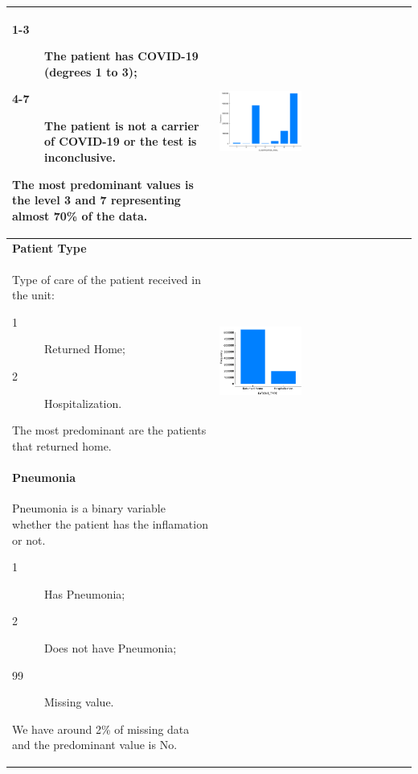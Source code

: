 \begin{longtable}{P{0.45\textwidth}P{0.45\textwidth}}
\begin{description}
    \item[1-3] The patient has COVID-19 (degrees 1 to 3);
    \item[4-7] The patient is not a carrier of COVID-19 or the test is inconclusive.
\end{description}
The most predominant values is the level 3 and 7 representing almost 70\% of the data.
& \includegraphics[width=0.44\textwidth]{img/appendix/feature_classification.png} 
\\ \hline
\textbf{Patient Type} & \\
Type of care of the patient received in the unit:
\begin{description}
    \item[1] Returned Home;
    \item[2] Hospitalization.
\end{description}
The most predominant are the patients that returned home.
& \includegraphics[width=0.44\textwidth]{img/appendix/feature_patient.png} 
\\ \hline
\textbf{Pneumonia} & \\
Pneumonia is a binary variable whether the patient has the inflamation or not.
\begin{description}
    \item[1] Has Pneumonia;
    \item[2] Does not have Pneumonia;
    \item[99] Missing value.
\end{description}
We have around 2\% of missing data and the predominant value is No.

\end{longtable}

